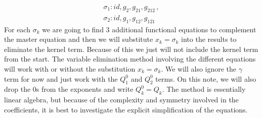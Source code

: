 \begin{align}
	\sigma_1: id, g_2, g_{21}, g_{212}\,,\\
	\sigma_2: id, g_1, g_{12}, g_{121}
\end{align}
For each $\sigma_k$ we are going to find 3 additional functional equations to complement the master equation and then we will substitute $x_k = \sigma_k$ into the results to eliminate the kernel term. Because of this we just will not include the kernel term from the start. The variable elimination method involving the different equations will work with or without the substitution $x_k = \sigma_k$. We will also ignore the $\gamma$ term for now and just work with the $Q_1^0$ and $Q_2^0$ terms. On this note, we will also drop the 0s from the exponents and write $Q_k^0 = Q_k$. The method is essentially linear algebra, but because of the complexity and symmetry involved in the coefficients, it is best to investigate the explicit simplification of the equations.

\endinput
